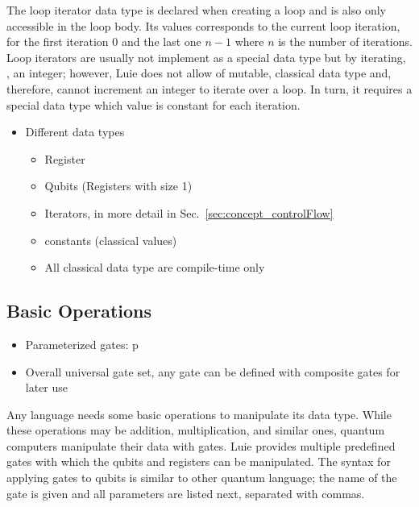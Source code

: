 The loop iterator data type is declared when creating a loop and is also only accessible in the loop body. Its values corresponds to the current loop iteration, \eg for the first iteration $0$ and the last one $n - 1$ where $n$ is the number of iterations. Loop iterators are usually not implement as a special data type but by iterating, \eg, an integer; however, Luie does not allow of mutable, classical data type and, therefore, cannot increment an integer to iterate over a loop. In turn, it requires a special data type which value is constant for each iteration. 
\begin{itemize}
    \item Different data types
    \begin{itemize}
        \item Register
        \item Qubits (Registers with size 1)
        \item Iterators, in more detail in Sec.~\ref{sec:concept_controlFlow}
        \item constants (classical values)
        \item All classical data type are compile-time only
    \end{itemize}
\end{itemize}


\subsection{Basic Operations}
\label{sec:concept_basicOperations}
\begin{itemize}
    \item Parameterized gates: p
    \item Overall universal gate set, any gate can be defined with composite gates for later use
\end{itemize}
Any language needs some basic operations to manipulate its data type. While these operations may be addition, multiplication, and similar ones, quantum computers manipulate their data with gates. Luie provides multiple predefined gates with which the qubits and registers can be manipulated. The syntax for applying gates to qubits is similar to other quantum language; the name of the gate is given and all parameters are listed next, separated with commas. 

